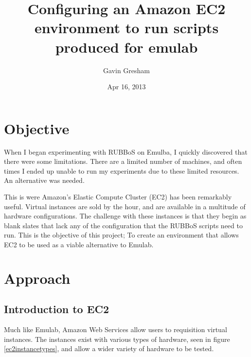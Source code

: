 \documentclass{article}
\begin{document}
\title{Configuring an Amazon EC2 environment to run scripts produced for emulab}
\author{Gavin Gresham}
\date{Apr 16, 2013}
\maketitle

\tableofcontents
\pagebreak

\section{Objective}
When I began experimenting with RUBBoS on Emulba, I quickly discovered that there were some limitations. There are a limited number of machines, and often times I ended up unable to run my experiments due to these limited resources. An alternative was needed.

This is were Amazon's Elastic Compute Cluster (EC2) has been remarkably useful. Virtual instances are sold by the hour, and are available in a multitude of hardware configurations. The challenge with these instances is that they begin as blank slates that lack any of the configuration that the RUBBoS scripts need to run. This is the objective of this project; To create an environment that allows EC2 to be used as a viable alternative to Emulab.
\section{Approach}
\subsection{Introduction to EC2}
Much like Emulab, Amazon Web Services allow users to requisition virtual instances. The instances exist with various types of hardware, seen in figure \ref{ec2instancetypes}, and allow a wider variety of hardware to be tested.
\end{document}
